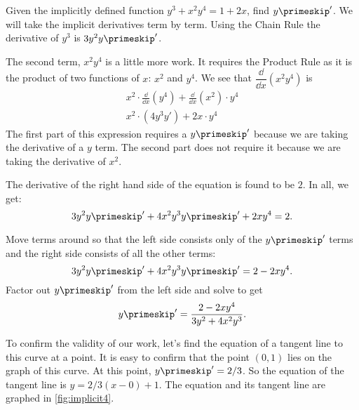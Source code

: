 \begin{example}\label{ex_implicit3}
Given the implicitly defined function $y^3+x^2y^4=1+2x$, find $y\primeskip'$.
\solution
We will take the implicit derivatives term by term. Using the Chain Rule the derivative of $y^3$ is $3y^2 y\primeskip'$.

The second term, $x^2y^4$ is a little more work. It requires the Product Rule as it is the product of two functions of $x$: $x^2$ and $y^4$. We see that $\dfrac{\dd}{\dd x}(x^2y^4)$ is
\begin{gather*}
x^2 \cdot \frac{\dd}{\dd x}(y^4) + \frac{\dd}{\dd x}(x^2) \cdot y^4 \\
x^2 \cdot (4y^3y') + 2x \cdot y^4 
\end{gather*}
The first part of this expression requires a $y\primeskip'$ because we are taking the derivative of a $y$ term. The second part does not require it because we are taking the derivative of $x^2$.

The derivative of the right hand side of the equation is found to be $2$. In all, we get:\vspace{-.3\baselineskip}
\[3y^2y\primeskip' + 4x^2y^3y\primeskip' + 2xy^4 = 2.\]

Move terms around so that the left side consists only of the $y\primeskip'$ terms and the right side consists of all the other terms:
\[3y^2y\primeskip' + 4x^2y^3y\primeskip' = 2-2xy^4.\]
Factor out $y\primeskip'$ from the left side and solve to get
\[y\primeskip' = \frac{2-2xy^4}{3y^2+4x^2y^3}.\]

To confirm the validity of our work, let's find the equation of a tangent line to this curve at a point. It is easy to confirm that the point $(0,1)$ lies on the graph of this curve. At this point, $y\primeskip' = 2/3$. So the equation of the tangent line is $y = 2/3(x-0)+1$. The equation and its tangent line are graphed in \autoref{fig:implicit4}.


\end{example}
